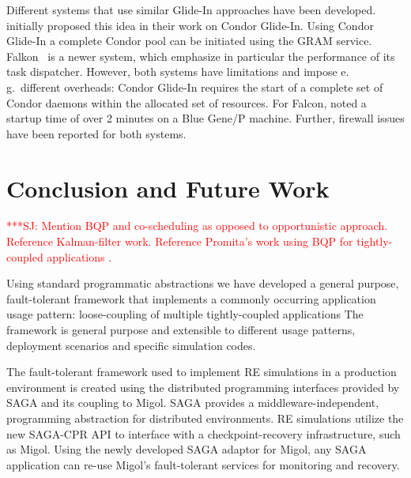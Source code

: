 \documentclass{rspublic}
\newcommand{\alnote}[1]{ {\textcolor{blue} { ***AL: #1 }}}
\newcommand{\jhanote}[1]{ {\textcolor{red} { ***SJ: #1 }}}
\newcommand{\alnote}[1]{}
\newcommand{\jhanote}[1]{}
\newcommand{\glidein}[1]{Glide-In }
\begin{document}
Different systems that use similar Glide-In approaches have been
developed. \citet{citeulike:291860} initially proposed this idea in
their work on Condor Glide-In. Using Condor Glide-In a complete Condor
pool can be initiated using the GRAM service. Falkon~\citep{1362680}
is a newer system, which emphasize in particular the performance of
its task dispatcher.  However, both systems have limitations and
impose e.\,g.\ different overheads: Condor \glidein\ requires the
start of a complete set of Condor daemons within the allocated set of
resources. For Falcon, \citet{citeulike:3169002} noted a startup time
of over 2 minutes on a Blue Gene/P machine. Further, firewall issues
have been reported for both systems.


\section{Conclusion and Future Work}

\jhanote{Mention BQP and co-scheduling as opposed to opportunistic
  approach. Reference Kalman-filter work. Reference Promita's work
  using BQP for tightly-coupled applications}.

Using standard programmatic abstractions we have developed a general
purpose, fault-tolerant framework that implements a commonly occurring
application usage pattern: loose-coupling of multiple tightly-coupled
applications The framework is general purpose and extensible to
different usage patterns, deployment scenarios and specific simulation
codes.

The fault-tolerant framework used to implement RE simulations in a
production environment is created using the distributed programming
interfaces provided by SAGA and its coupling to Migol.  SAGA provides
a middleware-independent, programming abstraction for distributed
environments. RE simulations utilize the new SAGA-CPR API to interface
with a checkpoint-recovery infrastructure, such as Migol. Using the
newly developed SAGA adaptor for Migol, any SAGA application can
re-use Migol's fault-tolerant services for monitoring and recovery.
\end{document}
